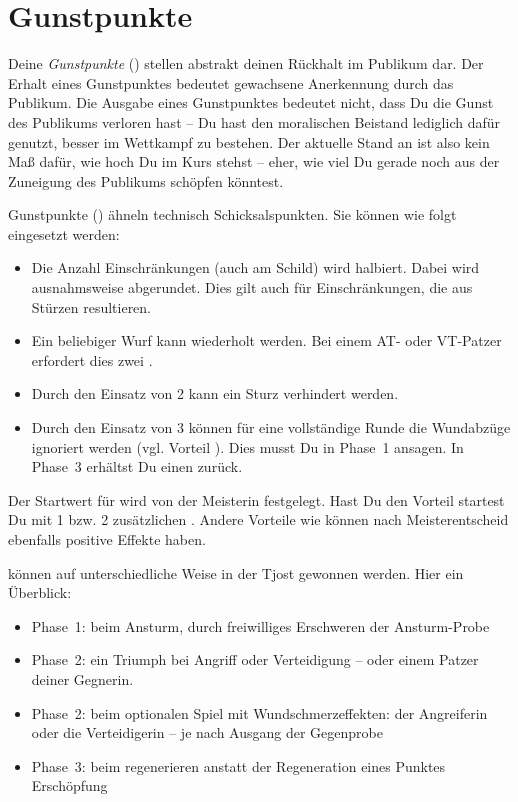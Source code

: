 \documentclass[12pt,div=calc,a5paper,parskip=half]{scrartcl}
\begin{document}
\section{Gunstpunkte}

Deine \emph{Gunstpunkte} (\gp) stellen abstrakt deinen Rückhalt im Publikum dar. Der Erhalt eines Gunstpunktes bedeutet gewachsene Anerkennung durch das Publikum. Die Ausgabe eines Gunstpunktes bedeutet nicht, dass Du die Gunst des Publikums verloren hast -- Du hast den moralischen Beistand lediglich dafür genutzt, besser im Wettkampf zu bestehen. Der aktuelle Stand an \gp ist also kein Maß dafür, wie hoch Du im Kurs stehst -- eher, wie viel Du gerade noch aus der Zuneigung des Publikums schöpfen könntest. 

Gunstpunkte (\gp) ähneln technisch Schicksalspunkten. Sie können wie folgt eingesetzt werden: 
\begin{itemize}
    \item Die Anzahl Einschränkungen (auch am Schild) wird halbiert. Dabei wird ausnahmsweise abgerundet. Dies gilt auch für Einschränkungen, die aus Stürzen resultieren.
    \item Ein beliebiger Wurf kann wiederholt werden. Bei einem AT- oder VT-Patzer erfordert dies zwei \gp.
    \item Durch den Einsatz von 2 \gp kann ein Sturz verhindert werden. 
    \item Durch den Einsatz von 3 \gp können für eine vollständige Runde die Wundabzüge ignoriert werden (vgl. Vorteil ). Dies musst Du in Phase~1 ansagen. In Phase~3 erhältst Du einen \gp zurück. 
\end{itemize}

Der Startwert für \gp wird von der Meisterin festgelegt. Hast Du den Vorteil  startest Du mit 1 bzw. 2 zusätzlichen \gp. Andere Vorteile wie  können nach Meisterentscheid ebenfalls positive Effekte haben.

\gp können auf unterschiedliche Weise in der Tjost gewonnen werden. Hier ein Überblick:
\begin{itemize}
    \item Phase~1: beim Ansturm, durch freiwilliges Erschweren der Ansturm-Probe 
    \item Phase~2: ein Triumph bei Angriff oder Verteidigung -- oder einem Patzer deiner Gegnerin.
    \item Phase~2: beim optionalen Spiel mit Wundschmerzeffekten: der Angreiferin oder die Verteidigerin -- je nach Ausgang der Gegenprobe
    \item Phase~3: beim regenerieren anstatt der Regeneration eines Punktes Erschöpfung
\end{itemize}
\end{document}
